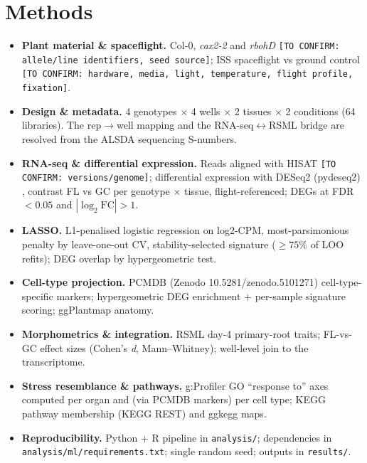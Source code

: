 \documentclass[pdflatex,sn-nature]{sn-jnl}
\begin{document}
\section{Methods}\label{sec:methods}
\begin{itemize}
  \item \textbf{Plant material \& spaceflight.} Col-0, \textit{cax2-2} and
    \textit{rbohD} \texttt{[TO CONFIRM: allele/line identifiers, seed source]}; ISS
    spaceflight vs ground control \texttt{[TO CONFIRM: hardware, media, light,
    temperature, flight profile, fixation]}.
  \item \textbf{Design \& metadata.} 4 genotypes \(\times\) 4 wells \(\times\) 2
    tissues \(\times\) 2 conditions (64 libraries). The rep\(\to\)well mapping and
    the RNA-seq\(\leftrightarrow\)RSML bridge are resolved from the ALSDA sequencing
    S-numbers.
  \item \textbf{RNA-seq \& differential expression.} Reads aligned with HISAT
    \cite{kim2015hisat} \texttt{[TO CONFIRM: versions/genome]}; differential
    expression with DESeq2 (pydeseq2) \cite{love2014,muzellec2023}, contrast FL vs
    GC per genotype \(\times\) tissue, flight-referenced; DEGs at FDR \(< 0.05\) and
    \(|\log_2\text{FC}| > 1\).
  \item \textbf{LASSO.} L1-penalised logistic regression \cite{tibshirani1996} on log2-CPM,
    most-parsimonious penalty by leave-one-out CV, stability-selected signature
    (\(\geq 75\%\) of LOO refits); DEG overlap by hypergeometric test.
  \item \textbf{Cell-type projection.} PCMDB \cite{jin2022pcmdb} (Zenodo
    10.5281/zenodo.5101271) cell-type-specific markers; hypergeometric DEG enrichment
    + per-sample signature scoring; ggPlantmap \cite{jo2024ggplantmap} anatomy.
  \item \textbf{Morphometrics \& integration.} RSML day-4 primary-root traits;
    FL-vs-GC effect sizes (Cohen's \textit{d}, Mann--Whitney); well-level join to the
    transcriptome.
  \item \textbf{Stress resemblance \& pathways.} g:Profiler \cite{raudvere2019} GO
    ``response to'' axes computed per organ and (via PCMDB markers) per cell type;
    KEGG \cite{kanehisa2000} pathway membership (KEGG REST) and ggkegg
    \cite{sato2023ggkegg} maps.
  \item \textbf{Reproducibility.} Python + R pipeline in \texttt{analysis/};
    dependencies in \texttt{analysis/ml/requirements.txt}; single random seed; outputs
    in \texttt{results/}.
\end{itemize}
\end{document}
